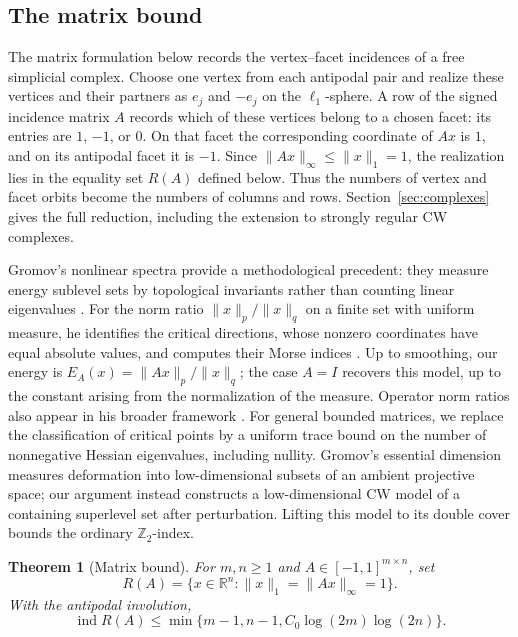 \documentclass[11pt]{article}
\newtheorem{theorem}{Theorem}
\theoremstyle{remark}
\DeclareMathOperator{\ind}{ind}
\newcommand{\R}{\mathbb R}
\newcommand{\Czero}{C_0}
\begin{document}
\subsection{The matrix bound}

The matrix formulation below records the vertex--facet incidences of a
free simplicial complex. Choose one vertex from each antipodal pair and
realize these vertices and their partners as $e_j$ and $-e_j$ on the
$\ell_1$-sphere. A row of the signed incidence matrix $A$ records which
of these vertices belong to a chosen facet: its entries are $1$, $-1$,
or $0$. On that facet the corresponding coordinate of $Ax$ is $1$,
and on its antipodal facet it is $-1$. Since $\|Ax\|_\infty\leq
\|x\|_1=1$, the realization lies in the equality set $R(A)$ defined
below. Thus the numbers of vertex and facet orbits become the numbers
of columns and rows. Section~\ref{sec:complexes} gives the full reduction,
including the extension to strongly regular CW complexes.

Gromov's nonlinear spectra provide a methodological precedent: they
measure energy sublevel sets by topological invariants rather than
counting linear eigenvalues \cite[\S\S0.3--0.4]{Gromov}.
For the norm ratio $\|x\|_p/\|x\|_q$ on a finite set with uniform
measure, he identifies the critical directions, whose nonzero
coordinates have equal absolute values, and computes their Morse
indices \cite[\S1.3.A, p.~150]{Gromov}. Up to smoothing, our energy is
$E_A(x)=\|Ax\|_p/\|x\|_q$; the case $A=I$ recovers this model,
up to the constant arising from the normalization of the measure.
Operator norm ratios also appear in his broader framework
\cite[\S3.1, pp.~153--154]{Gromov}. For general bounded matrices,
we replace the classification of critical points by a uniform trace
bound on the number of nonnegative Hessian eigenvalues, including
nullity. Gromov's essential dimension measures deformation into
low-dimensional subsets of an ambient projective space; our argument
instead constructs a low-dimensional CW model of a containing
superlevel set after perturbation. Lifting this model to its double
cover bounds the ordinary $\mathbb Z_2$-index.

\begin{theorem}[Matrix bound]\label{thm:matrix}
For $m,n\geq1$ and $A\in[-1,1]^{m\times n}$, set
\[
 R(A)=\{x\in\R^n:\|x\|_1=\|Ax\|_\infty=1\}.
\]
With the antipodal involution,
\begin{equation}\label{eq:matrix}
 \ind R(A)\leq
 \min\{m-1,n-1,\Czero\log(2m)\log(2n)\}.
\end{equation}
\end{theorem}
\end{document}
